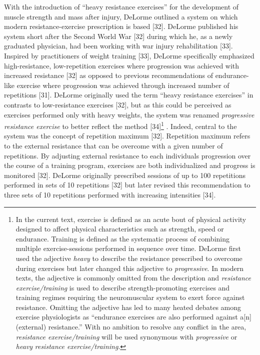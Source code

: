\documentclass[twoside,10pt]{gihclass} %
\begin{document}
With the introduction of ``heavy resistance exercises'' for the development of muscle strength and mass after injury, DeLorme outlined a system on which modern resistance-exercise prescription is based {[}32{]}.
DeLorme published his system short after the Second World War {[}32{]}
during which he, as a newly graduated physician, had been working with war injury rehabilitation
{[}33{]}.
Inspired by practitioners of weight training {[}33{]},
DeLorme specifically emphasized high-resistance, low-repetition exercises where progression was achieved with increased resistance {[}32{]} as opposed to previous recommendations of endurance-like exercise where progression was achieved through increased number of repetitions
{[}31{]}.
DeLorme originally used the term ``heavy resistance exercises'' in contrasts to low-resistance exercises {[}32{]}, but as this could be perceived as exercises performed only with heavy weights, the system was renamed \emph{progressive resistance exercise} to better reflect the method
{[}34{]}\footnote{In the current text, exercise is defined as an acute bout of physical activity designed to affect physical characteristics such as strength, speed or endurance. Training is defined as the systematic process of combining multiple exercise-sessions performed in sequence over time. DeLorme first used the adjective \emph{heavy} to describe the resistance prescribed to overcome during exercises but later changed this adjective to \emph{progressive}. In modern texts, the adjective is commonly omitted from the description and \emph{resistance exercise/training} is used to describe strength-promoting exercises and training regimes requiring the neuromuscular system to exert force against resistance. Omitting the adjective has led to many heated debates among exercise physiologists as ``endurance exercises are also performed against a{[}n{]} (external) resistance.'' With no ambition to resolve any conflict in the area, \emph{resistance exercise/training} will be used synonymous with \emph{progressive} or \emph{heavy} \emph{resistance exercise/training}.}
.
Indeed, central to the system was the concept of repetition maximum {[}32{]}.
Repetition maximum refers to the external resistance that can be overcome with a given number of repetitions.
By adjusting external resistance to each individuals progression over the course of a training program, exercises are both individualized and progress is monitored {[}32{]}.
DeLorme originally prescribed sessions of up to 100 repetitions performed in sets of 10 repetitions {[}32{]} but later revised this recommendation to three sets of 10 repetitions performed with increasing intensities
{[}34{]}.
\end{document}
